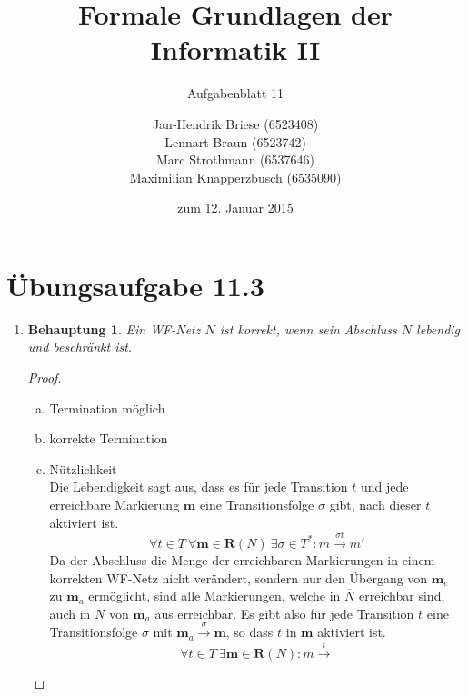 \documentclass[a4paper]{scrartcl}
\title{Formale Grundlagen der Informatik II}
\subtitle{Aufgabenblatt 11}
\author{
    Jan-Hendrik Briese (6523408) \\
    Lennart Braun (6523742) \\
    Marc Strothmann (6537646) \\
    Maximilian Knapperzbusch (6535090)
}
\date{zum 12. Januar 2015}
\newtheorem*{behaupt}{Behauptung}
\begin{document}
\maketitle

\section*{Übungsaufgabe 11.3} 
\begin{enumerate}
    \item
        \begin{behaupt}
            Ein WF-Netz $N$ ist korrekt, wenn sein Abschluss $\overline{N}$
            lebendig und beschränkt ist.
        \end{behaupt}
        \begin{proof} \hfill \\
            \begin{enumerate}[a)]
                \item Termination möglich \\

                \item korrekte Termination \\

                \item Nützlichkeit \\
                    Die Lebendigkeit sagt aus, dass es für jede Transition $t$
                    und jede erreichbare Markierung $\textbf{m}$ eine
                    Transitionsfolge $\sigma$ gibt, nach dieser $t$ aktiviert
                    ist. 
                    \begin{equation}
                        \forall t \in T \ 
                        \forall \textbf{m} \in \textbf{R}(N) \ 
                        \exists \sigma \in T^* :
                        m \stackrel{\sigma t}{\longrightarrow} m'
                    \end{equation}
                    Da der Abschluss die Menge der erreichbaren Markierungen in
                    einem korrekten WF-Netz nicht verändert, sondern nur den
                    Übergang von $\textbf{m}_e$ zu $\textbf{m}_a$ ermöglicht,
                    sind alle Markierungen, welche in $\overline{N}$ erreichbar
                    sind, auch in $N$ von $\textbf{m}_a$ aus erreichbar.
                    Es gibt also für jede Transition $t$ eine Transitionsfolge
                    $\sigma$ mit
                    $\textbf{m}_a \stackrel{\sigma}{\longrightarrow} \textbf{m}$,
                    so dass $t$ in $\textbf{m}$ aktiviert ist.
                    \begin{equation}
                        \forall t \in T \ 
                        \exists \textbf{m} \in \textbf{R}(N) :
                        m \stackrel{t}{\longrightarrow}
                    \end{equation}
                    

\end{enumerate}
\end{proof}
\end{enumerate}
\end{document}
